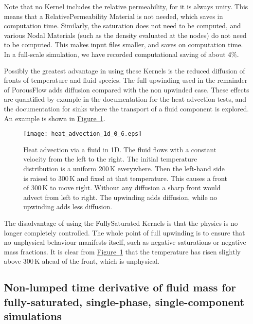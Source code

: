 \documentclass[12pt]{report}
\begin{document}
Note that no Kernel includes the relative permeability, for it is
always unity.  This means that a RelativePermeability Material is not
needed, which saves in computation time.  Similarly, the saturation
does not need to be computed, and various Nodal Materials (such as the
density evaluated at the nodes) do not need to be computed.  This
makes input files smaller, and saves on computation time.  In a
full-scale simulation, we have recorded computational saving of about
4\%.

Possibly the greatest advantage in using these Kernels is the reduced
diffusion of fronts of temperature and fluid species.  The full
upwinding used in the remainder of PorousFlow adds diffusion compared
with the non upwinded case.  These effects are quantified by example
in the documentation for the heat advection tests, and the
documentation for sinks where the transport of a fluid component is
explored.  An example is shown in
\hyperref[eg_heat_advect.fig]{Figure~\ref*{eg_heat_advect.fig}}.

\begin{figure}[htb]
\centering
\texttt{[image: heat\_advection\_1d\_0\_6.eps]}
\caption{Heat advection via a fluid in 1D.  The fluid flows with a
  constant velocity from the left to the right.  The initial
  temperature distribution is a uniform 200\,K everywhere.  Then the
  left-hand side is raised to 300\,K and fixed at that temperature.
  This causes a front of 300\,K to move right.  Without any diffusion a
  sharp front would advect from left to right.  The upwinding adds
  diffusion, while no upwinding adds less diffusion.}
\label{eg_heat_advect.fig}
\end{figure}

The disadvantage of using the FullySaturated Kernels is that the
physics is no longer completely controlled.  The whole point of full
upwinding is to ensure that no unphysical behaviour manifests itself,
such as negative saturations or negative mass fractions.  It is clear
from \hyperref[eg_heat_advect.fig]{Figure~\ref*{eg_heat_advect.fig}}
that the temperature has risen slightly above 300\,K ahead of the front, which
is unphysical.



\subsection{Non-lumped time derivative of fluid mass for
  fully-saturated, single-phase, single-component simulations}
\label{no_lump_sec}
\end{document}
